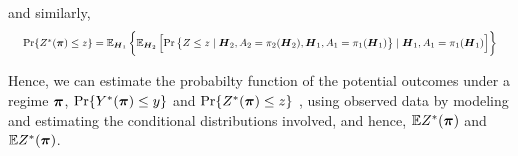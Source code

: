 and similarly, 
\begin{equation*}
\resizebox{\textwidth}{!}{
$\text{Pr}\{ Z^*(\bs{\pi}) \le z\} =  \mb{E}_{\bs{H}_1} \lt\{ \mb{E}_{\bs{H}_2}\lt[  \text{Pr}\lt\{Z \le z \mid \bs{H}_2 , A_2 = \pi_2(\bs{H}_2), \bs{H}_1 , A_1 = \pi_1(\bs{H}_1)\rt\}  \mid \bs{H}_1, A_1 = \pi_1(\bs{H}_1) \rt] \rt\}$
}
\end{equation*}




Hence, we can estimate the probabilty function of the potential outcomes under a regime $\boldsymbol{\pi}$, $\text{Pr}\{ Y^*(\boldsymbol{\pi}) \le y\}$ and $\text{Pr}\{ Z^*(\boldsymbol{\pi}) \le z\}$  , using observed data by modeling and estimating the conditional distributions involved, and hence, $\mathbb{E}Z^*(\boldsymbol{\pi})$ and $\mathbb{E}Z^*(\boldsymbol{\pi})$.\\

